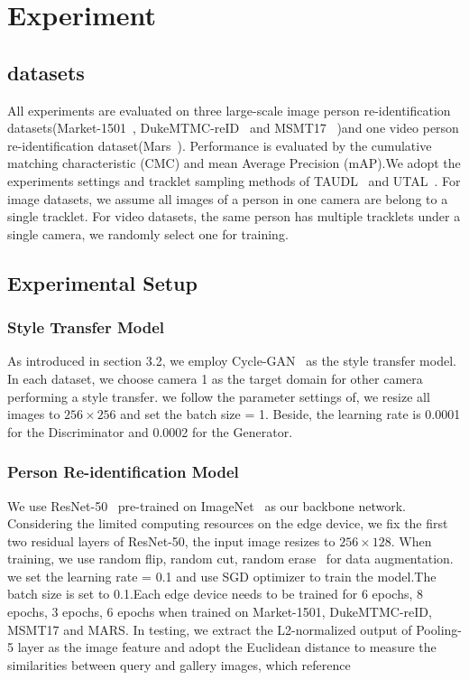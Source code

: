 \documentclass{article}
\begin{document}
\section{Experiment}
\subsection{datasets}

All experiments are evaluated on three large-scale image person re-identification datasets(Market-1501~\cite{zheng2015scalable}, DukeMTMC-reID~\cite{ristani2016performance,zheng2017unlabeled} and MSMT17~\cite{wei2018person} )and one video person re-identification dataset(Mars~\cite{zheng2016mars}). Performance is evaluated by the cumulative matching characteristic (CMC) and mean Average Precision (mAP).We adopt the experiments settings and tracklet sampling methods of TAUDL~\cite{li2018unsupervised} and UTAL~\cite{li2019unsupervised}.  For image datasets, we assume all images of a person in one camera are belong to a single tracklet. For video datasets,  the same person has multiple tracklets under a single camera, we randomly select one for training.


\subsection{Experimental Setup}


\subsubsection{Style Transfer Model}
As introduced in section 3.2,  we employ Cycle-GAN~\cite{zhu2017unpaired} as the style transfer model. In each dataset, we choose camera 1 as the target domain for other camera performing a style transfer. we follow the parameter settings of, we resize all images to $256\times 256$ and set the batch size = 1. Beside, the learning rate is 0.0001 for the Discriminator and 0.0002 for the Generator.

\subsubsection{Person Re-identification Model}
We use ResNet-50~\cite{he2016deep} pre-trained on ImageNet~\cite{deng2009imagenet} as our backbone network. Considering the limited computing resources on the edge device, we fix the first two residual layers of ResNet-50, the input image resizes to $256\times128$. When training, we use random flip, random cut, random erase~\cite{zhong2017random} for data augmentation. we set the learning rate = 0.1 and use SGD optimizer to train the model.The batch size is set to 0.1.Each edge device needs to be trained for 6 epochs, 8 epochs, 3 epochs, 6 epochs when trained on Market-1501, DukeMTMC-reID, MSMT17 and MARS. In testing, we extract the L2-normalized output of Pooling-5 layer as the image feature and adopt the Euclidean distance to measure the similarities between query and gallery images, which reference ~\cite{zhong2019invariance}
\end{document}
